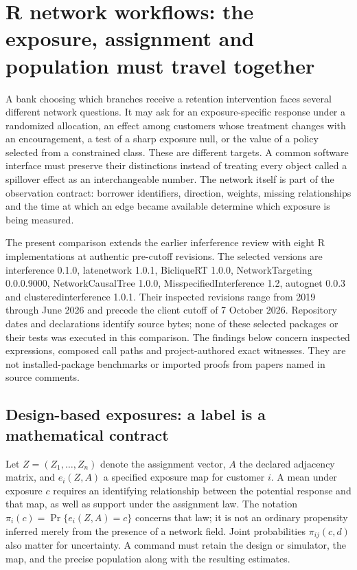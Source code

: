 \section{R network workflows: the exposure, assignment and population must travel together}
\label{sec:exec25-r-network}

A bank choosing which branches receive a retention intervention faces several different network questions. It may ask for an exposure-specific response under a randomized allocation, an effect among customers whose treatment changes with an encouragement, a test of a sharp exposure null, or the value of a policy selected from a constrained class. These are different targets. A common software interface must preserve their distinctions instead of treating every object called a spillover effect as an interchangeable number. The network itself is part of the observation contract: borrower identifiers, direction, weights, missing relationships and the time at which an edge became available determine which exposure is being measured.

The present comparison extends the earlier inferference review with eight R implementations at authentic pre-cutoff revisions. The selected versions are interference 0.1.0, latenetwork 1.0.1, BicliqueRT 1.0.0, NetworkTargeting 0.0.0.9000, NetworkCausalTree 1.0.0, MisspecifiedInterference 1.2, autognet 0.0.3 and clusteredinterference 1.0.1. Their inspected revisions range from 2019 through June 2026 and precede the client cutoff of 7 October 2026. Repository dates and declarations identify source bytes; none of these selected packages or their tests was executed in this comparison. The findings below concern inspected expressions, composed call paths and project-authored exact witnesses. They are not installed-package benchmarks or imported proofs from papers named in source comments.\citep{exec24_interference_inferference,exec25_rnet_exposure,exec25_rnet_late,exec25_rnet_biclique,exec25_rnet_target,exec25_rnet_tree,exec25_rnet_nmr,exec25_rnet_auto,exec25_rnet_cluster}

\subsection{Design-based exposures: a label is a mathematical contract}

Let $Z=(Z_1,\ldots,Z_n)$ denote the assignment vector, $A$ the declared adjacency matrix, and $e_i(Z,A)$ a specified exposure map for customer $i$. A mean under exposure $c$ requires an identifying relationship between the potential response and that map, as well as support under the assignment law. The notation $\pi_i(c)=\Pr\{e_i(Z,A)=c\}$ concerns that law; it is not an ordinary propensity inferred merely from the presence of a network field. Joint probabilities $\pi_{ij}(c,d)$ also matter for uncertainty. A command must retain the design or simulator, the map, and the precise population along with the resulting estimates.

